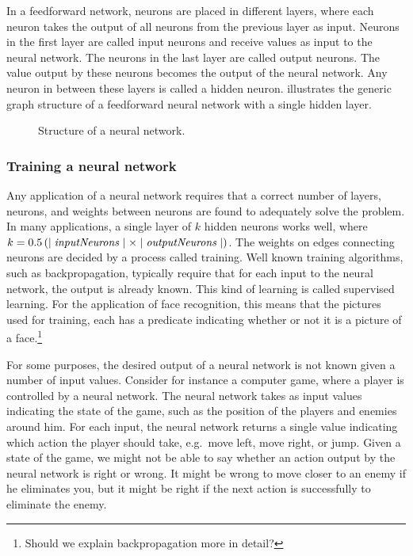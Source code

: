 In a feedforward network, neurons are placed in different layers, where each neuron takes the output of all neurons from the previous layer as input. Neurons in the first layer are called input neurons and receive values as input to the neural network.  The neurons in the last layer are called output neurons. The value output by these neurons becomes the output of the neural network. Any neuron in between these layers is called a hidden neuron.  illustrates the generic graph structure of a feedforward neural network with a single hidden layer.

\begin{figure}[htpb]
  \centering
  
  \caption{Structure of a neural network.}
  \label{fig:ann}
\end{figure}

\subsubsection{Training a neural network}
Any application of a neural network requires that a correct number of layers, neurons, and weights between neurons are found to adequately solve the problem. In many applications, a single layer of $k$ hidden neurons works well, where $k = 0.5\left(\mid\mathit{inputNeurons}\mid \times \mid\mathit{outputNeurons}\mid\right)$\citpls. The weights on edges connecting neurons are decided by a process called training. Well known training algorithms, such as backpropagation, typically require that for each input to the neural network, the output is already known. This kind of learning is called supervised learning. For the application of face recognition, this means that the pictures used for training, each has a predicate indicating whether or not it is a picture of a face.\footnote{Should we explain backpropagation more in detail?}

For some purposes, the desired output of a neural network is not known given a number of input values. Consider for instance a computer game, where a player is controlled by a neural network. The neural network takes as input values indicating the state of the game, such as the position of the players and enemies around him. For each input, the neural network returns a single value indicating which action the player should take, e.g.\ move left, move right, or jump. Given a state of the game, we might not be able to say whether an action output by the neural network is right or wrong. It might be wrong to move closer to an enemy if he eliminates you, but it might be right if the next action is successfully to eliminate the enemy.

